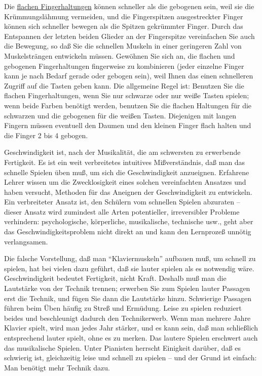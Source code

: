 Die \hyperref[c1iii4b]{flachen Fingerhaltungen} können schneller als die gebogenen sein, weil sie die Krümmungslähmung vermeiden, und die Fingerspitzen ausgestreckter Finger können sich schneller bewegen als die Spitzen gekrümmter Finger.
Durch das Entspannen der letzten beiden Glieder an der Fingerspitze vereinfachen Sie auch die Bewegung, so daß Sie die schnellen Muskeln in einer geringeren Zahl von Muskelsträngen entwickeln müssen.
Gewöhnen Sie sich an, die flachen und gebogenen Fingerhaltungen fingerweise zu kombinieren (jeder einzelne Finger kann je nach Bedarf gerade oder gebogen sein), weil Ihnen das einen schnelleren Zugriff auf die Tasten geben kann.
Die allgemeine Regel ist: Benutzen Sie die flachen Fingerhaltungen, wenn Sie nur schwarze oder nur weiße Tasten spielen; wenn beide Farben benötigt werden, benutzen Sie die flachen Haltungen für die schwarzen und die gebogenen für die weißen Tasten.
Diejenigen mit langen Fingern müssen eventuell den Daumen und den kleinen Finger flach halten und die Finger 2 bis 4 gebogen.

Geschwindigkeit ist, nach der Musikalität, die am schwersten zu erwerbende Fertigkeit.
Es ist ein weit verbreitetes intuitives Mißverständnis, daß man das schnelle Spielen üben muß, um sich die Geschwindigkeit anzueignen.
Erfahrene Lehrer wissen um die Zwecklosigkeit eines solchen vereinfachten Ansatzes und haben versucht, Methoden für das Aneignen der Geschwindigkeit zu entwickeln.
Ein verbreiteter Ansatz ist, den Schülern vom schnellen Spielen abzuraten -- dieser Ansatz wird zumindest alle Arten potentieller, irreversibler Probleme verhindern: psychologische, körperliche, musikalische, technische usw., geht aber das Geschwindigkeitsproblem nicht direkt an und kann den Lernprozeß unnötig verlangsamen.

Die falsche Vorstellung, daß man \enquote{Klaviermuskeln} aufbauen muß, um schnell zu spielen, hat bei vielen dazu geführt, daß sie lauter spielen als es notwendig wäre.
Geschwindigkeit bedeutet Fertigkeit, nicht Kraft.
Deshalb muß man die Lautstärke von der Technik trennen; erwerben Sie zum Spielen lauter Passagen erst die Technik, und fügen Sie dann die Lautstärke hinzu.
Schwierige Passagen führen beim Üben häufig zu Streß und Ermüdung.
Leise zu spielen reduziert beides und beschleunigt dadurch den Technikerwerb.
Wenn man mehrere Jahre Klavier spielt, wird man jedes Jahr stärker, und es kann sein, daß man schließlich entsprechend lauter spielt, ohne es zu merken.
Das lautere Spielen erschwert auch das musikalische Spielen.
Unter Pianisten herrscht Einigkeit darüber, daß es schwierig ist, gleichzeitig leise und schnell zu spielen -- und der Grund ist einfach: Man benötigt mehr Technik dazu.

